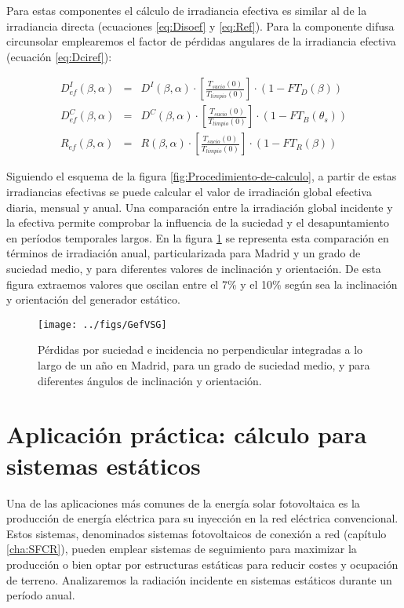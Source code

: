 Para estas componentes el cálculo de irradiancia efectiva es similar
al de la irradiancia directa (ecuaciones \ref{eq:Disoef} y \ref{eq:Ref}).
Para la componente difusa circunsolar emplearemos el factor de pérdidas
angulares de la irradiancia efectiva (ecuación \ref{eq:Dciref}):

\begin{eqnarray}
D_{ef}^{I}(\beta,\alpha) & = & D^{I}(\beta,\alpha)\cdot\left[\frac{T_{sucio}(0)}{T_{limpio}(0)}\right]\cdot(1-FT_{D}(\beta))\label{eq:Disoef}\\
D_{ef}^{C}(\beta,\alpha) & = & D^{C}(\beta,\alpha)\cdot\left[\frac{T_{sucio}(0)}{T_{limpio}(0)}\right]\cdot(1-FT_{B}(\theta_{s}))\label{eq:Dciref}\\
R_{ef}(\beta,\alpha) & = & R(\beta,\alpha)\cdot\left[\frac{T_{sucio}(0)}{T_{limpio}(0)}\right]\cdot(1-FT_{R}(\beta))\label{eq:Ref}\end{eqnarray}


Siguiendo el esquema de la figura \ref{fig:Procedimiento-de-calculo},
a partir de estas irradiancias efectivas se puede calcular el valor
de irradiación global efectiva diaria, mensual y anual. Una comparación
entre la irradiación global incidente y la efectiva permite comprobar
la influencia de la suciedad y el desapuntamiento en períodos temporales
largos. En la figura \ref{fig:PerdidasSuciedadReflexion} se representa
esta comparación en términos de irradiación anual, particularizada
para Madrid y un grado de suciedad medio, y para diferentes valores
de inclinación y orientación. De esta figura extraemos valores que
oscilan entre el 7\% y el 10\% según sea la inclinación y orientación
del generador estático.

%
\begin{figure}
\texttt{[image: ../figs/GefVSG]}

\caption{Pérdidas por suciedad e incidencia no perpendicular integradas a lo
largo de un año en Madrid, para un grado de suciedad medio, y para
diferentes ángulos de inclinación y orientación.\label{fig:PerdidasSuciedadReflexion}}

\end{figure}
\section{Aplicación práctica: cálculo para sistemas estáticos}

Una de las aplicaciones más comunes de la energía solar fotovoltaica
es la producción de energía eléctrica para su inyección en la red
eléctrica convencional. Estos sistemas, denominados sistemas fotovoltaicos
de conexión a red (capítulo \ref{cha:SFCR}), pueden emplear sistemas
de seguimiento para maximizar la producción o bien optar por estructuras
estáticas para reducir costes y ocupación de terreno. Analizaremos
la radiación incidente en sistemas estáticos durante un período anual.


